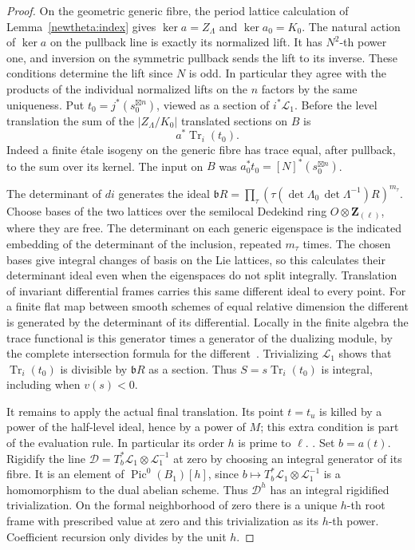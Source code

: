 \begin{proof}
On the geometric generic fibre, the period lattice calculation of
Lemma~\ref{newtheta:index} gives \(\ker a=Z_\Lambda\) and
\(\ker a_0=K_0\). The natural action of \(\ker a\) on the pullback
line is exactly its normalized lift. It has \(N^2\)-th power one,
and inversion on the symmetric pullback sends the lift to its
inverse. These conditions determine the lift since \(N\) is odd.
In particular they agree with the products of the individual
normalized lifts on the \(n\) factors by the same uniqueness.
Put \(t_0=j^*(s_0^{\boxtimes n})\), viewed as a section of
\(i^*\mathcal L_1\). Before the level translation the sum of
the \(|Z_\Lambda/K_0|\) translated sections on \(B\) is
\[
                 a^*\operatorname{Tr}_i(t_0).
\]
Indeed a finite étale isogeny on the generic fibre has trace
equal, after pullback, to the sum over its kernel. The input
on \(B\) was \(a_0^*t_0=[N]^*(s_0^{\boxtimes n})\).

The determinant of \(di\) generates the ideal
\(\mathfrak b R=\prod_\tau
 (\tau(\det\Lambda_0\,\det\Lambda^{-1})R)^{m_\tau}\).
Choose bases of the two lattices over the semilocal Dedekind
ring \(O\otimes\mathbf Z_{(\ell)}\), where they are free.
The determinant on each generic eigenspace is the indicated
embedding of the determinant of the inclusion, repeated \(m_\tau\)
times. The chosen bases give integral changes of basis on the
Lie lattices, so this calculates their determinant ideal even
when the eigenspaces do not split integrally.
Translation of invariant differential frames carries this same
different ideal to every point. For a finite flat map between smooth
schemes of equal relative dimension the different is generated by
the determinant of its differential. Locally in the finite
algebra the trace functional is this generator times a generator
of the dualizing module, by the complete intersection formula
for the different~\cite{tateDifferent}. Trivializing \(\mathcal L_1\)
shows that \(\operatorname{Tr}_i(t_0)\) is divisible by
\(\mathfrak b R\) as a section. Thus \(S=s\operatorname{Tr}_i(t_0)\)
is integral, including when \(v(s)<0\).

It remains to apply the actual final translation. Its point
\(t=t_u\) is killed by a power of the half-level ideal, hence by
a power of \(M\); this extra condition is part of the evaluation
rule. In particular its order \(h\) is prime to \(\ell\).
.
Set \(b=a(t)\). Rigidify the line
\(\mathcal D=T_b^*\mathcal L_1\otimes\mathcal L_1^{-1}\) at zero
by choosing an integral generator of its fibre. It is an element
of \(\operatorname{Pic}^0(B_1)[h]\), since \(b\mapsto
T_b^*\mathcal L_1\otimes\mathcal L_1^{-1}\) is a homomorphism
to the dual abelian scheme. Thus \(\mathcal D^h\) has an integral
rigidified trivialization. On the formal neighborhood of zero
there is a unique \(h\)-th root frame with prescribed value at
zero and this trivialization as its \(h\)-th power. Coefficient
recursion only divides by the unit \(h\).


\end{proof}
